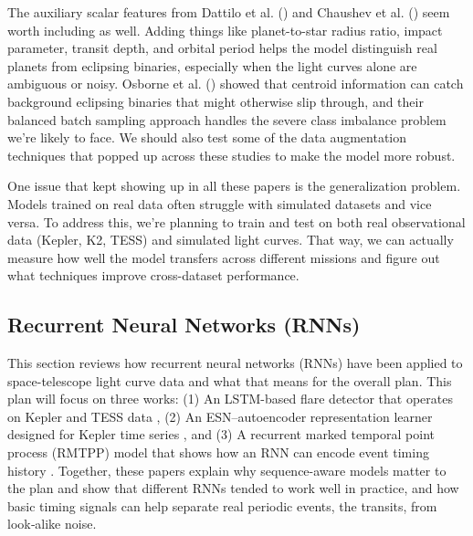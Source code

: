 \documentclass[letterpaper]{article} %
\begin{document}
The auxiliary scalar features from Dattilo et al. (\citeyear{Dattilo2019identifyexoplanetsII}) and Chaushev et al. (\citeyear{Chaushev2019ngts}) seem worth including as well. Adding things like planet-to-star radius ratio, impact parameter, transit depth, and orbital period helps the model distinguish real planets from eclipsing binaries, especially when the light curves alone are ambiguous or noisy. Osborne et al. (\citeyear{Osborn2019rapidclassificationtesscandidates}) showed that centroid information can catch background eclipsing binaries that might otherwise slip through, and their balanced batch sampling approach handles the severe class imbalance problem we're likely to face. We should also test some of the data augmentation techniques that popped up across these studies to make the model more robust.

One issue that kept showing up in all these papers is the generalization problem. Models trained on real data often struggle with simulated datasets and vice versa. To address this, we're planning to train and test on both real observational data (Kepler, K2, TESS) and simulated light curves. That way, we can actually measure how well the model transfers across different missions and figure out what techniques improve cross-dataset performance.

\subsection{Recurrent Neural Networks (RNNs)}
This section reviews how recurrent neural networks (RNNs) have been applied to space-telescope light curve data and what that means for the overall plan. This plan will focus on three works: (1) An LSTM-based flare detector that operates on Kepler and TESS data \cite{Vida2021findingflaresrecurrent}, (2) An ESN–autoencoder representation learner designed for Kepler time series \cite{kugler2016explorativeapproachkepler}, and (3) A recurrent marked temporal point process (RMTPP) model that shows how an RNN can encode event timing history \cite{Du2016markedtemporalpoint}. Together, these papers explain why sequence-aware models matter to the plan and show that different RNNs tended to work well in practice, and how basic timing signals can help separate real periodic events, the transits, from look‑alike noise.
\end{document}
